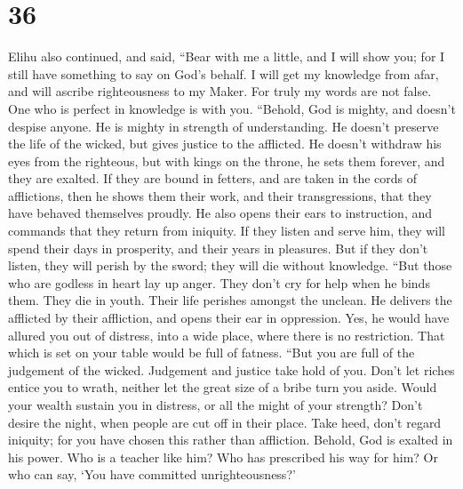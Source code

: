 \hypertarget{section-35}{%
\section{36}\label{section-35}}

 Elihu also continued, and said,  ``Bear
with me a little, and I will show you; for I still have something to say
on God's behalf.  I will get my knowledge from afar, and
will ascribe righteousness to my Maker.  For truly my
words are not false. One who is perfect in knowledge is with you.
 ``Behold, God is mighty, and doesn't despise anyone. He
is mighty in strength of understanding.  He doesn't
preserve the life of the wicked, but gives justice to the afflicted.
 He doesn't withdraw his eyes from the righteous, but with
kings on the throne, he sets them forever, and they are exalted.
 If they are bound in fetters, and are taken in the cords
of afflictions,  then he shows them their work, and their
transgressions, that they have behaved themselves proudly.
 He also opens their ears to instruction, and commands
that they return from iniquity.  If they listen and serve
him, they will spend their days in prosperity, and their years in
pleasures.  But if they don't listen, they will perish by
the sword; they will die without knowledge.  ``But those
who are godless in heart lay up anger. They don't cry for help when he
binds them.  They die in youth. Their life perishes
amongst the unclean.  He delivers the afflicted by their
affliction, and opens their ear in oppression.  Yes, he
would have allured you out of distress, into a wide place, where there
is no restriction. That which is set on your table would be full of
fatness.  ``But you are full of the judgement of the
wicked. Judgement and justice take hold of you.  Don't
let riches entice you to wrath, neither let the great size of a bribe
turn you aside.  Would your wealth sustain you in
distress, or all the might of your strength?  Don't
desire the night, when people are cut off in their place.
 Take heed, don't regard iniquity; for you have chosen
this rather than affliction.  Behold, God is exalted in
his power. Who is a teacher like him?  Who has prescribed
his way for him? Or who can say, `You have committed unrighteousness?'
